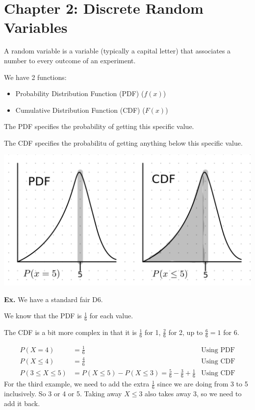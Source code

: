 \documentclass[12pt,letterpaper]{article} \usepackage{amsmath} \usepackage{graphicx} \usepackage[margin=1in]{geometry} \usepackage{longtable}  \usepackage{amssymb}
\begin{document}
	\section{Chapter 2: Discrete Random Variables}
	A random variable is a variable (typically a capital letter) that associates a number to every outcome of an experiment. 
	
	We have 2 functions:
	\begin{itemize}
		\item Probability Distribution Function (PDF) ($f(x)$)
		\item Cumulative Distribution Function (CDF) ($F(x)$)
	\end{itemize}

	The PDF specifies the probability of getting this specific value. 
	
	The CDF specifies the probabilitu of getting anything below this specific value. 
	\begin{center}
		\includegraphics[width=0.7\linewidth]{pdf-vs-cdf}
	\end{center}

	\begin{mdframed}
		\textbf{Ex. } We have a standard fair D6. 
		
		We know that the PDF is $\frac{1}{6}$ for each value. 
		
		The CDF is a bit more complex in that it is $\frac{1}{6}$ for 1, $\frac{2}{6}$ for 2, up to $\frac{6}{6} = 1$ for 6. 
		
		\begin{align*}
			P(X=4) &= \frac{1}{6} &\text{Using PDF}\\
			P(X\le 4) &= \frac{4}{6}  &\text {Using CDF}\\
			P(3\le X\le 5) &= P(X\le 5) - P(X\le 3) = \frac{5}{6} - \frac{3}{6} + \frac {1}{6} &\text{Using CDF}
		\end{align*}
		For the third example, we need to add the extra $\frac{1}{6}$ since we are doing from 3 to 5 inclusively. So 3 or 4 or 5. Taking away $X\le 3$ also takes away 3, so we need to add it back.
	\end{mdframed}
	
\end{document}
